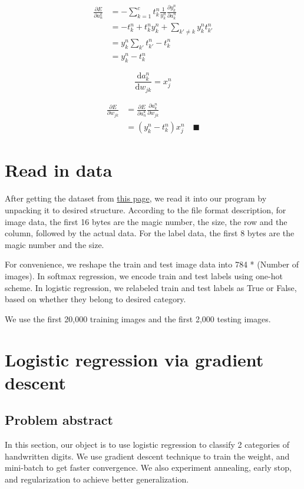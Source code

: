\documentclass{article}
\begin{document}
\begin{equation*}
\begin{split}
	\frac{\partial E}{\partial a_n^k} &= - \sum_{k=1}^{c} t_k^n \frac{1}{y_k^n} \frac{\partial y_k^n}{\partial a_k^n}  \\
	&= -t_k^n + t_k^n y_k^n + \sum_{k' \ne k} y_k^n t_{k'}^n\\
	&= y_k^n \sum_{k'}t_{k'}^n - t_k^n \\
	&= y_k^n - t_k^n
\end{split}
\end{equation*}

\begin{equation*}
	\dfrac{\mathrm{d} a_k^n}{\mathrm{d} w_{jk}} = x_j^n
\end{equation*}

\begin{equation*}
\begin{split}
	\frac{\partial E}{\partial w_{jk}} &= \frac{\partial E}{\partial a_n^k} \frac{\partial a_k^n}{\partial w_{jk}} \\
	&= (y_k^n - t_k^n) x_j^n \quad\blacksquare
\end{split}
\end{equation*}

\section{Read in data}
After getting the dataset from \href{http://yann.lecun.com/exdb/mnist/}{this page}, we read it into our program by unpacking it to desired structure. According to the file format description, for image data, the first 16 bytes are the magic number, the size, the row and the column, followed by the actual data. For the label data, the first 8 bytes are the magic number and the size.

For convenience, we reshape the train and test image data into 784 * (Number of images). In softmax regression, we encode train and test labels using one-hot scheme. In logistic regression, we relabeled train and test labels as True or False, based on whether they belong to desired category.

We use the first 20,000 training images and the first 2,000 testing images.

\section{Logistic regression via gradient descent}
\subsection{Problem abstract}
In this section, our object is to use logistic regression to classify 2 categories of handwritten digits. We use gradient descent technique to train the weight, and mini-batch to get faster convergence. We also experiment annealing, early stop, and regularization to achieve better generalization.
\end{document}
